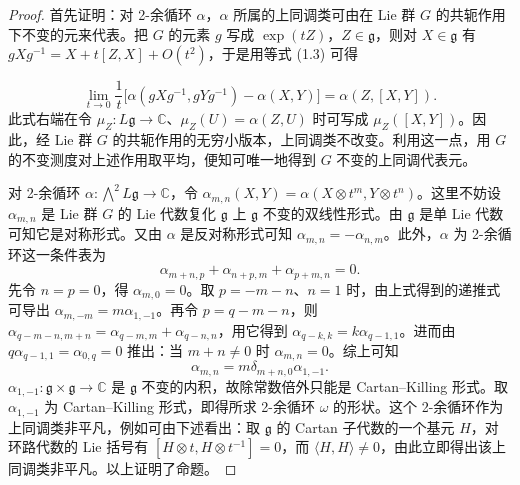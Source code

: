 \begin{proof}
  首先证明：对 2-余循环 $\alpha$，$\alpha$ 所属的上同调类可由在 Lie 群 $G$ 的共轭作用下不变的元来代表。把 $G$ 的元素 $g$ 写成 $\exp(tZ)$，$Z\in\mathfrak{g}$，则对 $X\in\mathfrak{g}$ 有
  $gXg^{-1}=X+t[Z,X]+O(t^{2})$，于是用等式 (1.3) 可得

  \[
    \lim_{t\to 0}\frac{1}{t}\bigl[\alpha(gXg^{-1},gYg^{-1})-\alpha(X,Y)\bigr]
    =\alpha(Z,[X,Y]).
  \]
  此式右端在令 $\mu_{Z}\colon L\mathfrak{g}\to\mathbb{C}$、$\mu_{Z}(U)=\alpha(Z,U)$ 时可写成 $\mu_{Z}([X,Y])$。因此，经 Lie 群 $G$ 的共轭作用的无穷小版本，上同调类不改变。利用这一点，用 $G$ 的不变测度对上述作用取平均，便知可唯一地得到 $G$ 不变的上同调代表元。

  对 2-余循环 $\alpha\colon\bigwedge^{2}L\mathfrak{g}\to\mathbb{C}$，令
  $\alpha_{m,n}(X,Y)=\alpha(X\otimes t^{m},Y\otimes t^{n})$。这里不妨设 $\alpha_{m,n}$ 是 Lie 群 $G$ 的 Lie 代数复化 $\mathfrak{g}$ 上 $\mathfrak{g}$ 不变的双线性形式。由 $\mathfrak{g}$ 是单 Lie 代数可知它是对称形式。又由 $\alpha$ 是反对称形式可知 $\alpha_{m,n}=-\alpha_{n,m}$。此外，$\alpha$ 为 2-余循环这一条件表为
  \[
    \alpha_{m+n,p}+\alpha_{n+p,m}+\alpha_{p+m,n}=0.
  \]
  先令 $n=p=0$，得 $\alpha_{m,0}=0$。取 $p=-m-n$、$n=1$ 时，由上式得到的递推式可导出 $\alpha_{m,-m}=m\alpha_{1,-1}$。再令 $p=q-m-n$，则
  $\alpha_{q-m-n,m+n}=\alpha_{q-m,m}+\alpha_{q-n,n}$，用它得到
  $\alpha_{q-k,k}=k\alpha_{q-1,1}$。进而由 $q\alpha_{q-1,1}=\alpha_{0,q}=0$ 推出：当 $m+n\ne 0$ 时 $\alpha_{m,n}=0$。综上可知
  \[
    \alpha_{m,n}=m\delta_{m+n,0}\alpha_{1,-1}.
  \]
  $\alpha_{1,-1}\colon\mathfrak{g}\times\mathfrak{g}\to\mathbb{C}$ 是 $\mathfrak{g}$ 不变的内积，故除常数倍外只能是 Cartan--Killing 形式。取 $\alpha_{1,-1}$ 为 Cartan--Killing 形式，即得所求 2-余循环 $\omega$ 的形状。这个 2-余循环作为上同调类非平凡，例如可由下述看出：取 $\mathfrak{g}$ 的 Cartan 子代数的一个基元 $H$，对环路代数的 Lie 括号有 $[H\otimes t,H\otimes t^{-1}]=0$，而 $\langle H,H\rangle\ne 0$，由此立即得出该上同调类非平凡。以上证明了命题。

\end{proof}



